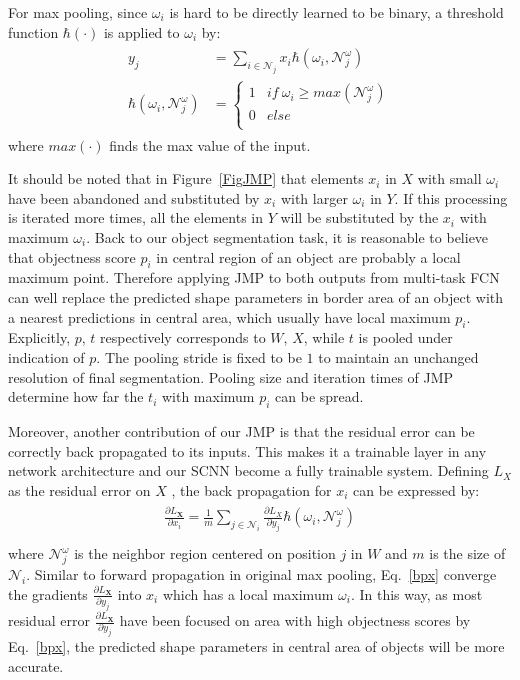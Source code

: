 For max pooling, since $\omega_i$ is hard to be directly learned to be binary, a threshold function $\hbar(\cdot)$ is applied to $\omega_{i}$ by:
\begin{eqnarray}\label{jmp}
\begin{aligned}
y_{j} &= \sum_{i\in \mathcal{N}_{j}}x_{i}\hbar(\omega_{i},\mathcal{N}^{\omega}_{j})\\
\hbar(\omega_{i},\mathcal{N}^{\omega}_{j})&=\left\{\begin{array}{cc}
1&if~\omega_{i}\geq max(\mathcal{N}^{\omega}_{j})\\
0&else\\
\end{array}\right.
\end{aligned}
\end{eqnarray}
where $max(\cdot)$ finds the max value of the input.

It should be noted that in Figure~\ref{FigJMP} that elements $x_i$ in $X$ with small $\omega_i$ have been abandoned and substituted by $x_i$ with larger $\omega_i$ in $Y$.
If this processing is iterated more times, all the elements in $Y$ will be substituted by the $x_i$ with maximum $\omega_i$.
Back to our object segmentation task, it is reasonable to believe that objectness score $p_i$ in central region of an object are probably a local maximum point.
Therefore applying JMP to both outputs from multi-task FCN can well replace the predicted shape parameters in border area of an object with a nearest predictions in central area, which usually have local maximum $p_i$.
Explicitly, $p$, $t$ respectively corresponds to $W$, $X$, while $t$ is pooled under indication of $p$.
The pooling stride is fixed to be $1$ to maintain an unchanged resolution of final segmentation.
Pooling size and iteration times of JMP determine how far the $t_i$ with maximum $p_i$ can be spread.


Moreover, another contribution of our JMP is that the residual error can be correctly back propagated to its inputs.
This makes it a trainable layer in any network architecture and our SCNN become a fully trainable system.
Defining $L_{X}$ as the residual error on $X$ , the back propagation for $x_{i}$ can be expressed by:
\begin{eqnarray}\label{bpx}
\begin{aligned}
\frac{\partial L_\mathbf{X}}{\partial x_{i}}=\frac{1}{m}\sum\limits_{j\in\mathcal{N}_{i}}\frac{\partial L_{X}}{\partial y_{j}}\hbar(\omega_{i},{\mathcal{N}}^{\omega}_{j})\\
\end{aligned}
\end{eqnarray}
where $\mathcal{N}^{\omega}_{j}$ is the neighbor region centered on position $j$ in $W$ and $m$ is the size of $\mathcal{N}_{i}$.
Similar to forward propagation in original max pooling, Eq.~\ref{bpx} converge the gradients $\frac{\partial L_\mathbf{X}}{\partial y_{j}}$ into $x_{i}$ which has a local maximum $\omega_{i}$.
In this way, as most residual error $\frac{\partial L_\mathbf{X}}{\partial y_{j}}$ have been focused on area with high objectness scores by Eq.~\ref{bpx}, the predicted shape parameters in central area of objects will be more accurate.

